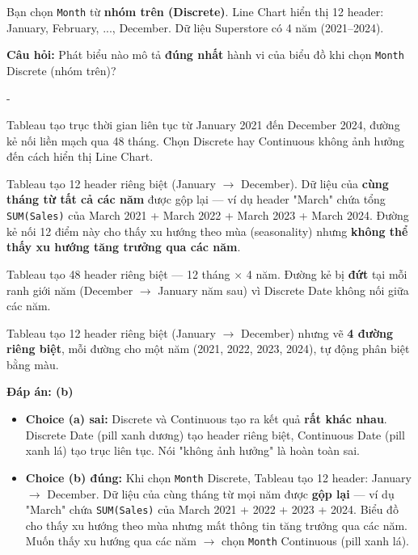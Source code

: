 \documentclass[12pt]{article}
\newcounter{choice}
\renewcommand\thechoice{($\alph{choice}$)}
\newcommand\choicelabel{\thechoice}
\newenvironment{choices}%
  {\list{\choicelabel}%
     {\usecounter{choice}\def\makelabel##1{\hss\llap{##1}}%
       \settowidth{\leftmargin}{W.\hskip\labelsep\hskip 0 em}%
       \def\choice{%
         \item
       } %
       \labelwidth\leftmargin\advance\labelwidth-\labelsep
       \topsep=0pt
       \partopsep=0pt
     }%
  }%
  {\endlist}
\begin{document}
\begin{enumerate}[label=\textbf{Câu \arabic*.}, leftmargin=*, labelsep=1em, itemsep=2em]
Bạn chọn \texttt{Month} từ \textbf{nhóm trên (Discrete)}. Line Chart hiển thị 12 header: January, February, ..., December. Dữ liệu Superstore có 4 năm (2021--2024).

\textbf{Câu hỏi:} Phát biểu nào mô tả \textbf{đúng nhất} hành vi của biểu đồ khi chọn \texttt{Month} Discrete (nhóm trên)?

\begin{choices}
    \choice Tableau tạo trục thời gian liên tục từ January 2021 đến December 2024, đường kẻ nối liền mạch qua 48 tháng. Chọn Discrete hay Continuous không ảnh hưởng đến cách hiển thị Line Chart.

    \choice Tableau tạo 12 header riêng biệt (January $\rightarrow$ December). Dữ liệu của \textbf{cùng tháng từ tất cả các năm} được gộp lại --- ví dụ header "March" chứa tổng \texttt{SUM(Sales)} của March 2021 + March 2022 + March 2023 + March 2024. Đường kẻ nối 12 điểm này cho thấy xu hướng theo mùa (seasonality) nhưng \textbf{không thể thấy xu hướng tăng trưởng qua các năm}.

    \choice Tableau tạo 48 header riêng biệt --- 12 tháng $\times$ 4 năm. Đường kẻ bị \textbf{đứt} tại mỗi ranh giới năm (December $\rightarrow$ January năm sau) vì Discrete Date không nối giữa các năm.

    \choice Tableau tạo 12 header riêng biệt (January $\rightarrow$ December) nhưng vẽ \textbf{4 đường riêng biệt}, mỗi đường cho một năm (2021, 2022, 2023, 2024), tự động phân biệt bằng màu.
\end{choices}

\textbf{Đáp án: (b)}

\begin{guidelinebox}

\begin{itemize}
    \item \textbf{Choice (a) sai:} Discrete và Continuous tạo ra kết quả \textbf{rất khác nhau}. Discrete Date (pill xanh dương) tạo header riêng biệt, Continuous Date (pill xanh lá) tạo trục liên tục. Nói "không ảnh hưởng" là hoàn toàn sai.

    \item \textbf{Choice (b) đúng:} Khi chọn \texttt{Month} Discrete, Tableau tạo 12 header: January $\rightarrow$ December. Dữ liệu của cùng tháng từ mọi năm được \textbf{gộp lại} --- ví dụ "March" chứa \texttt{SUM(Sales)} của March 2021 + 2022 + 2023 + 2024. Biểu đồ cho thấy xu hướng theo mùa nhưng mất thông tin tăng trưởng qua các năm. Muốn thấy xu hướng qua các năm $\rightarrow$ chọn \texttt{Month} Continuous (pill xanh lá).


\end{itemize}
\end{guidelinebox}
\end{enumerate}
\end{document}
